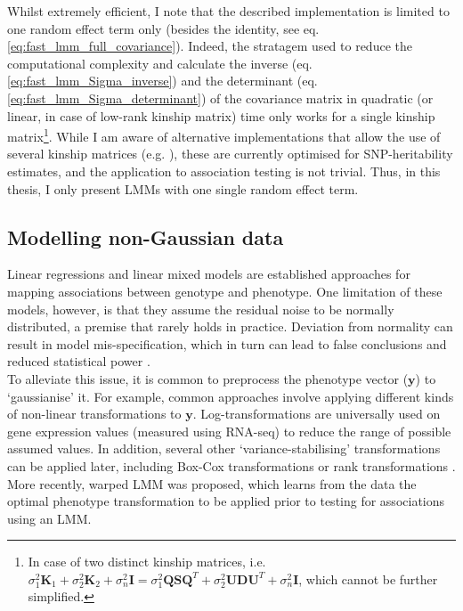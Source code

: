 Whilst extremely efficient, I note that the described implementation is limited to one random effect term only (besides the identity, see eq. \eqref{eq:fast_lmm_full_covariance}).
Indeed, the stratagem used to reduce the computational complexity and calculate the inverse (eq. \eqref{eq:fast_lmm_Sigma_inverse}) and the determinant (eq. \eqref{eq:fast_lmm_Sigma_determinant}) of the covariance matrix in quadratic (or linear, in case of low-rank kinship matrix) time only works for a single kinship matrix\footnote{In case of two distinct kinship matrices, i.e. $\sigma_1^2\mathbf{K}_1 + \sigma_2^2\mathbf{K}_2 + \sigma_n^2\mathbf{I} = \sigma_1^2\mathbf{Q}\mathbf{S}\mathbf{Q}^T + \sigma_2^2\mathbf{U}\mathbf{D}\mathbf{U}^T + \sigma_n^2\mathbf{I}$, which cannot be further simplified.}.
While I am aware of alternative implementations that allow the use of several kinship matrices (e.g. \cite{pazokitoroudi2020efficient}), these are currently optimised for SNP-heritability estimates, and the application to association testing is not trivial.
Thus, in this thesis, I only present LMMs with one single random effect term.



\subsection{Modelling non-Gaussian data}
\label{sec:non_gaussian}

Linear regressions and linear mixed models are established approaches for mapping associations between genotype and phenotype. 
One limitation of these models, however, is that they assume the residual noise to be normally distributed, a premise that rarely holds in practice. 
Deviation from normality can result in model mis-specification, which in turn can lead to false conclusions and reduced statistical power \cite{mcculloch2014generalized}.  \\

To alleviate this issue, it is common to preprocess the phenotype vector ($\mathbf{y}$) to `gaussianise' it. 
For example, common approaches involve applying different kinds of non-linear transformations to $\mathbf{y}$. 
Log-transformations are universally used on gene expression values (measured using RNA-seq) to reduce the range of possible assumed values.
In addition, several other `variance-stabilising' transformations can be applied later, including Box-Cox transformations \cite{box1964analysis} or rank transformations \cite{zhou2014efficient}.
More recently, warped LMM \cite{fusi2014warped} was proposed, which learns from the data the optimal phenotype transformation to be applied prior to testing for associations using an LMM. 
\\


